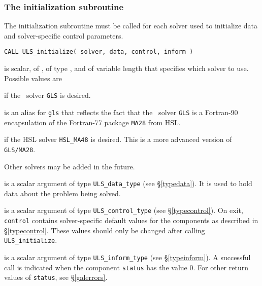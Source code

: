 \documentclass{galahad}
\newcommand{\packagename}{ULS}
\begin{document}

\galarguments


\subsubsection{The initialization subroutine}\label{subinit}
The initialization subroutine must be called for each solver used 
to initialize data and solver-specific control parameters.

\hskip0.5in 
{\tt CALL \packagename\_initialize( solver, data, control, inform )}
\begin{description}

 is scalar, of \intentin, of type \character, and of variable
length that specifies which solver to use. Possible values are
\begin{description} 
 if the \galahad\ solver {\tt GLS} is desired.

 is an alias for {\tt gls} that reflects the fact that the \galahad\ 
 solver {\tt GLS} is a Fortran-90 encapsulation of the Fortran-77 
 package {\tt MA28} from HSL.

 if the HSL solver {\tt HSL\_MA48} is desired. This is a more
advanced version of {\tt GLS/MA28}.




\end{description} 
Other solvers may be added in the future.

 is a scalar \intentout argument of type 
{\tt \packagename\_data\_type}
(see \S\ref{typedata}). It is used to hold data about the problem being 
solved. 

 is a scalar \intentout argument of type 
{\tt \packagename\_control\_type}
(see \S\ref{typecontrol}). 
On exit, {\tt control} contains solver-specific default values for the 
components as described in \S\ref{typecontrol}.
These values should only be changed after calling 
{\tt \packagename\_initialize}.

 is a scalar \intentout argument of type 
{\tt \packagename\_inform\_type}
(see \S\ref{typeinform}). 
A successful call is indicated when the  component {\tt status} has the value 0. 
For other return values of {\tt status}, see \S\ref{galerrors}.

\end{description}
\end{document}

